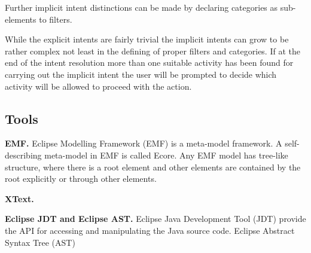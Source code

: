 Further implicit intent distinctions can be made by declaring categories as sub-elements to filters.

While the explicit intents are fairly trivial the implicit intents can grow to be rather complex not least in the defining of proper filters and categories. If at the end of the intent resolution more than one suitable activity has been found for carrying out the implicit intent the user will be prompted to decide which activity will be allowed to proceed with the action. 


\subsection{Tools}
\textbf{EMF.} Eclipse Modelling Framework (EMF) is a meta-model framework. A self-describing meta-model in EMF is called Ecore. Any EMF model has tree-like structure, where there is a root element and other elements are contained by the root explicitly or through other elements. 


\textbf{XText.}


\textbf{Eclipse JDT and Eclipse AST.} Eclipse Java Development Tool (JDT) \cite{jdt} provide the API for accessing and manipulating the Java source code. Eclipse Abstract Syntax Tree (AST) 

